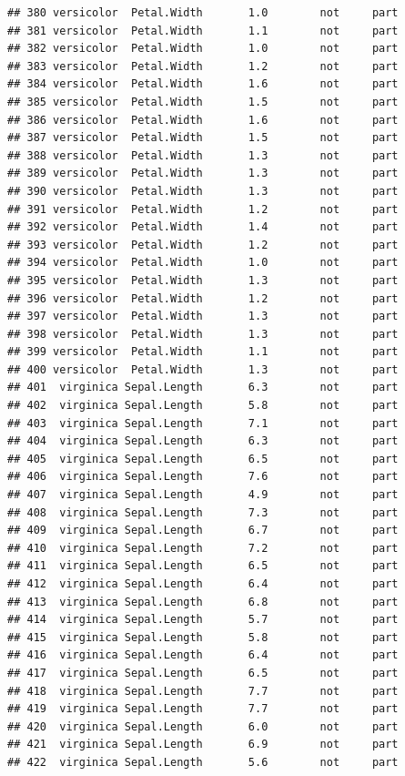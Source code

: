 \documentclass[krantz2]{krantz}\usepackage{knitr}%
\begin{document}
\begin{knitrout}
\begin{kframe}
\begin{verbatim}
## 380 versicolor  Petal.Width       1.0        not     part
## 381 versicolor  Petal.Width       1.1        not     part
## 382 versicolor  Petal.Width       1.0        not     part
## 383 versicolor  Petal.Width       1.2        not     part
## 384 versicolor  Petal.Width       1.6        not     part
## 385 versicolor  Petal.Width       1.5        not     part
## 386 versicolor  Petal.Width       1.6        not     part
## 387 versicolor  Petal.Width       1.5        not     part
## 388 versicolor  Petal.Width       1.3        not     part
## 389 versicolor  Petal.Width       1.3        not     part
## 390 versicolor  Petal.Width       1.3        not     part
## 391 versicolor  Petal.Width       1.2        not     part
## 392 versicolor  Petal.Width       1.4        not     part
## 393 versicolor  Petal.Width       1.2        not     part
## 394 versicolor  Petal.Width       1.0        not     part
## 395 versicolor  Petal.Width       1.3        not     part
## 396 versicolor  Petal.Width       1.2        not     part
## 397 versicolor  Petal.Width       1.3        not     part
## 398 versicolor  Petal.Width       1.3        not     part
## 399 versicolor  Petal.Width       1.1        not     part
## 400 versicolor  Petal.Width       1.3        not     part
## 401  virginica Sepal.Length       6.3        not     part
## 402  virginica Sepal.Length       5.8        not     part
## 403  virginica Sepal.Length       7.1        not     part
## 404  virginica Sepal.Length       6.3        not     part
## 405  virginica Sepal.Length       6.5        not     part
## 406  virginica Sepal.Length       7.6        not     part
## 407  virginica Sepal.Length       4.9        not     part
## 408  virginica Sepal.Length       7.3        not     part
## 409  virginica Sepal.Length       6.7        not     part
## 410  virginica Sepal.Length       7.2        not     part
## 411  virginica Sepal.Length       6.5        not     part
## 412  virginica Sepal.Length       6.4        not     part
## 413  virginica Sepal.Length       6.8        not     part
## 414  virginica Sepal.Length       5.7        not     part
## 415  virginica Sepal.Length       5.8        not     part
## 416  virginica Sepal.Length       6.4        not     part
## 417  virginica Sepal.Length       6.5        not     part
## 418  virginica Sepal.Length       7.7        not     part
## 419  virginica Sepal.Length       7.7        not     part
## 420  virginica Sepal.Length       6.0        not     part
## 421  virginica Sepal.Length       6.9        not     part
## 422  virginica Sepal.Length       5.6        not     part

\end{verbatim}
\end{kframe}
\end{knitrout}
\end{document}

